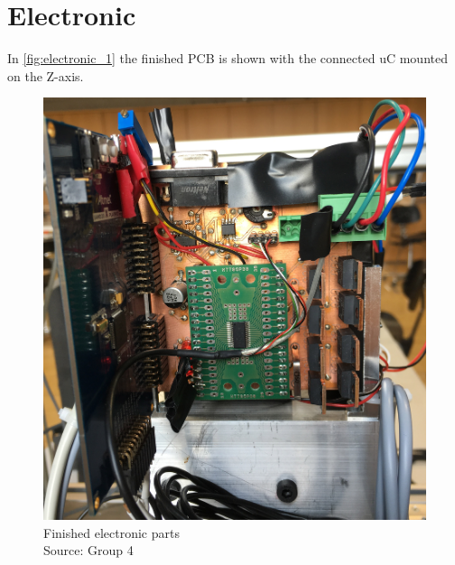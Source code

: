 \documentclass[a4paper,12pt]{scrreprt}
\begin{document}
\newpage

\section{Electronic}
In \autoref{fig:electronic_1} the finished \acs{PCB} is shown with the connected \acs{uC} mounted on the Z-axis.
\begin{figure}[H]
  \centering
   \includegraphics[width=1\textwidth]{pictures/electronic_1}
   \caption[Finished electronic parts]{Finished electronic parts\\
	Source: Group 4  
   }
   \label{fig:electronic_1}
\end{figure} 
\end{document}
